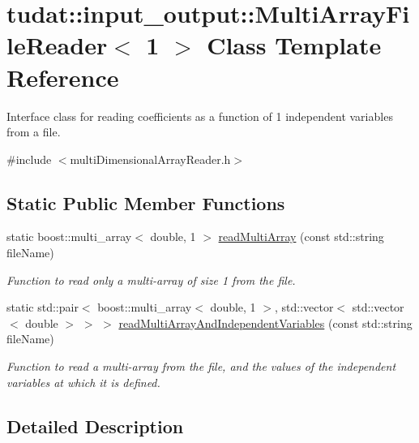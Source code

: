\hypertarget{classtudat_1_1input__output_1_1MultiArrayFileReader_3_011_01_4}{}\section{tudat\+:\+:input\+\_\+output\+:\+:Multi\+Array\+File\+Reader$<$ 1 $>$ Class Template Reference}
\label{classtudat_1_1input__output_1_1MultiArrayFileReader_3_011_01_4}


Interface class for reading coefficients as a function of 1 independent variables from a file.  




{\ttfamily \#include $<$multi\+Dimensional\+Array\+Reader.\+h$>$}

\subsection*{Static Public Member Functions}
\begin{DoxyCompactItemize}
\item 
static boost\+::multi\+\_\+array$<$ double, 1 $>$ \hyperlink{classtudat_1_1input__output_1_1MultiArrayFileReader_3_011_01_4_a886e534bbc95306fb55b7f3100951c6a}{read\+Multi\+Array} (const std\+::string file\+Name)
\begin{DoxyCompactList}\small\item\em Function to read only a multi-\/array of size 1 from the file. \end{DoxyCompactList}\item 
static std\+::pair$<$ boost\+::multi\+\_\+array$<$ double, 1 $>$, std\+::vector$<$ std\+::vector$<$ double $>$ $>$ $>$ \hyperlink{classtudat_1_1input__output_1_1MultiArrayFileReader_3_011_01_4_ae0bc3012f5bffdd3cb658c7817960fc3}{read\+Multi\+Array\+And\+Independent\+Variables} (const std\+::string file\+Name)
\begin{DoxyCompactList}\small\item\em Function to read a multi-\/array from the file, and the values of the independent variables at which it is defined. \end{DoxyCompactList}\end{DoxyCompactItemize}


\subsection{Detailed Description}

